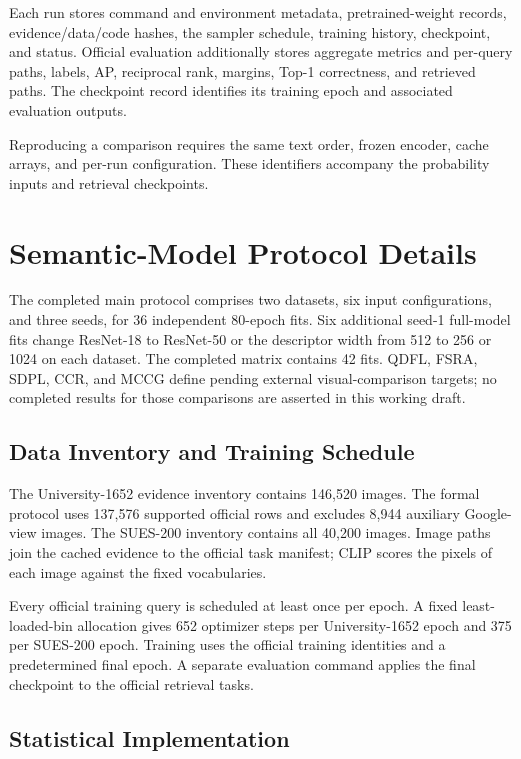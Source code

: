 \documentclass[journal]{IEEEtran}
\begin{document}
Each run stores command and environment metadata, pretrained-weight records,
evidence/data/code hashes, the sampler schedule, training history, checkpoint,
and status.  Official evaluation additionally stores aggregate metrics and
per-query paths, labels, AP, reciprocal rank, margins, Top-1 correctness, and
retrieved paths.  The checkpoint record identifies its training epoch and associated
evaluation outputs.

Reproducing a comparison requires the same text order, frozen encoder,
cache arrays, and per-run configuration. These identifiers accompany the
probability inputs and retrieval checkpoints.

\section{Semantic-Model Protocol Details}

The completed main protocol comprises two datasets, six input configurations,
and three seeds, for 36 independent 80-epoch fits. Six additional seed-1 full-model fits
change ResNet-18 to ResNet-50 or the descriptor width from 512 to 256 or
1024 on each dataset. The completed matrix contains 42 fits. QDFL, FSRA, SDPL,
CCR, and MCCG define pending external visual-comparison targets; no completed
results for those comparisons are asserted in this working draft.

\subsection{Data Inventory and Training Schedule}

The University-1652 evidence inventory contains 146,520 images. The formal
protocol uses 137,576 supported official rows and excludes 8,944 auxiliary
Google-view images. The SUES-200 inventory contains all 40,200 images.
Image paths join the cached evidence to the official task manifest;
CLIP scores the pixels of each image against the fixed vocabularies.

Every official training query is scheduled at least once per epoch. A fixed
least-loaded-bin allocation gives 652 optimizer steps per University-1652
epoch and 375 per SUES-200 epoch. Training uses the official training identities and a predetermined final
epoch. A separate evaluation command applies the final checkpoint to the
official retrieval tasks.

\subsection{Statistical Implementation}
\end{document}
